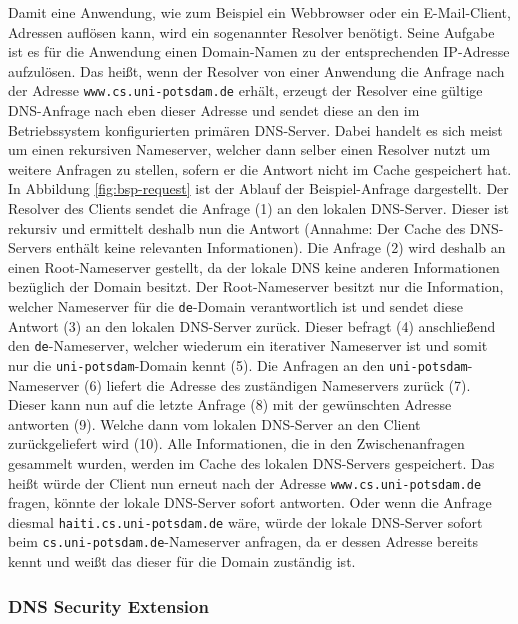 \documentclass[a4paper, 12pt, BCOR10mm, DIV12, toc=bibliography, toc=listof, german]{scrbook}
\begin{document}
				Damit eine Anwendung, wie zum Beispiel ein Webbrowser oder ein E-Mail-Client, Adressen
				auflösen kann, wird ein sogenannter Resolver benötigt. Seine Aufgabe ist es für die
				Anwendung einen Domain-Namen zu der entsprechenden IP-Adresse aufzulösen. Das heißt, wenn
				der Resolver von einer Anwendung die Anfrage nach der Adresse \texttt{www.cs.uni-potsdam.de}
				erhält, erzeugt der Resolver eine gültige DNS-Anfrage \cite{rfc1035} nach eben dieser
				Adresse und sendet diese an den im Betriebssystem konfigurierten primären DNS-Server. Dabei
				handelt es sich meist um einen rekursiven Nameserver, welcher dann selber einen Resolver
				nutzt um weitere Anfragen zu stellen, sofern er die Antwort nicht im Cache gespeichert hat.
				In Abbildung \ref{fig:bsp-request} ist der Ablauf der Beispiel-Anfrage dargestellt. Der
				Resolver des Clients sendet die Anfrage (1) an den lokalen DNS-Server. Dieser ist rekursiv
				und ermittelt deshalb nun die Antwort (Annahme: Der Cache des DNS-Servers enthält keine
				relevanten Informationen). Die Anfrage (2) wird deshalb an einen Root-Nameserver gestellt,
				da der lokale DNS keine anderen Informationen bezüglich der Domain besitzt. Der
				Root-Nameserver besitzt nur die Information, welcher Nameserver für die \texttt{de}-Domain
				verantwortlich ist und sendet diese Antwort (3) an den lokalen DNS-Server zurück. Dieser
				befragt (4) anschließend den \texttt{de}-Nameserver, welcher wiederum ein iterativer
				Nameserver ist und somit nur die \texttt{uni-potsdam}-Domain kennt (5). Die Anfragen an den
				\texttt{uni-potsdam}-Nameserver (6) liefert die Adresse des zuständigen Nameservers zurück
				(7). Dieser kann nun auf die letzte Anfrage (8) mit der gewünschten Adresse antworten (9).
				Welche dann vom lokalen DNS-Server an den Client zurückgeliefert wird (10). Alle
				Informationen, die in den Zwischenanfragen gesammelt wurden, werden im Cache des lokalen
				DNS-Servers gespeichert. Das heißt würde der Client nun erneut nach der Adresse
				\texttt{www.cs.uni-potsdam.de} fragen, könnte der lokale DNS-Server sofort antworten. Oder
				wenn die Anfrage diesmal \texttt{haiti.cs.uni-potsdam.de} wäre, würde der lokale DNS-Server
				sofort beim \texttt{cs.uni-potsdam.de}-Nameserver anfragen, da er dessen Adresse bereits
				kennt und weißt das dieser für die Domain zuständig ist.


			\subsubsection*{DNS Security Extension} %
\end{document}
